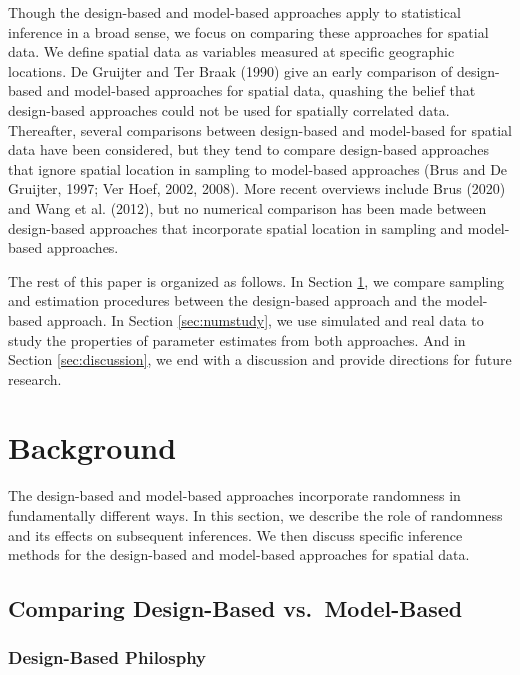 \documentclass[]{elsarticle} %
\begin{document}
Though the design-based and model-based approaches apply to statistical
inference in a broad sense, we focus on comparing these approaches for
spatial data. We define spatial data as variables measured at specific
geographic locations. De Gruijter and Ter Braak (1990) give an early
comparison of design-based and model-based approaches for spatial data,
quashing the belief that design-based approaches could not be used for
spatially correlated data. Thereafter, several comparisons between
design-based and model-based for spatial data have been considered, but
they tend to compare design-based approaches that ignore spatial
location in sampling to model-based approaches (Brus and De Gruijter,
1997; Ver Hoef, 2002, 2008). More recent overviews include Brus (2020)
and Wang et al. (2012), but no numerical comparison has been made
between design-based approaches that incorporate spatial location in
sampling and model-based approaches.

The rest of this paper is organized as follows. In Section
\ref{sec:background}, we compare sampling and estimation procedures
between the design-based approach and the model-based approach. In
Section \ref{sec:numstudy}, we use simulated and real data to study the
properties of parameter estimates from both approaches. And in Section
\ref{sec:discussion}, we end with a discussion and provide directions
for future research.

\hypertarget{sec:background}{%
\section{Background}\label{sec:background}}

The design-based and model-based approaches incorporate randomness in
fundamentally different ways. In this section, we describe the role of
randomness and its effects on subsequent inferences. We then discuss
specific inference methods for the design-based and model-based
approaches for spatial data.

\hypertarget{comparing-design-based-vs.-model-based}{%
\subsection{Comparing Design-Based
vs.~Model-Based}\label{comparing-design-based-vs.-model-based}}

\hypertarget{design-based-philosphy}{%
\subsubsection{Design-Based Philosphy}\label{design-based-philosphy}}
\end{document}
